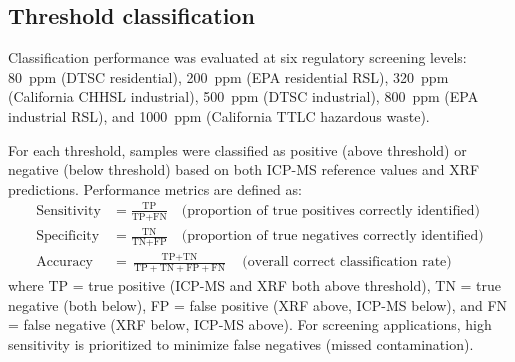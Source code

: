\documentclass[journal=esthag,manuscript=suppinfo]{achemso}
\begin{document}
\subsection*{Threshold classification}

Classification performance was evaluated at six regulatory screening levels: 80~ppm (DTSC residential), 200~ppm (EPA residential RSL), 320~ppm (California CHHSL industrial), 500~ppm (DTSC industrial), 800~ppm (EPA industrial RSL), and 1000~ppm (California TTLC hazardous waste).

For each threshold, samples were classified as positive (above threshold) or negative (below threshold) based on both ICP-MS reference values and XRF predictions. Performance metrics are defined as:
\begin{align}
\text{Sensitivity} &= \frac{\text{TP}}{\text{TP} + \text{FN}} \quad \text{(proportion of true positives correctly identified)} \label{eq:sens} \\[0.5em]
\text{Specificity} &= \frac{\text{TN}}{\text{TN} + \text{FP}} \quad \text{(proportion of true negatives correctly identified)} \label{eq:spec} \\[0.5em]
\text{Accuracy} &= \frac{\text{TP} + \text{TN}}{\text{TP} + \text{TN} + \text{FP} + \text{FN}} \quad \text{(overall correct classification rate)} \label{eq:acc}
\end{align}
where TP = true positive (ICP-MS and XRF both above threshold), TN = true negative (both below), FP = false positive (XRF above, ICP-MS below), and FN = false negative (XRF below, ICP-MS above). For screening applications, high sensitivity is prioritized to minimize false negatives (missed contamination).
\end{document}
